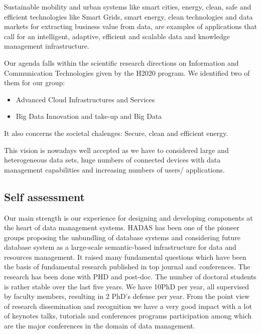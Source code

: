Sustainable mobility and urban systems like smart cities, energy, clean, safe and efficient technologies like Smart Grids, smart energy, clean technologies and  data markets for extracting business value from data, are examples of applications that call for an intelligent, adaptive, efficient and scalable data and knowledge management infrastructure. 

Our agenda falls within the  scientific research directions on Information and Communication Technologies given by  the H2020 program. We identified two of them for our group:
\begin{itemize}
\item Advanced Cloud Infrastructures and Services
\item Big Data Innovation and take-up and Big Data  
\end{itemize}
It also concerns the societal chalenges: Secure, clean and efficient energy. 

This vision is nowadays well accepted as we have to considered large and heterogeneous data sets, huge numbers of connected devices with data management capabilities and increasing numbers of users/ applications. 


\subsection{Self assessment} %
\label{sub:hadas_self_assesment}


Our main strength is our experience for designing and developing components at the heart of data management systems. HADAS has been one of the pioneer groups proposing the unbundling of database systems and considering future database system as a large-scale semantic-based infrastructure for data and resources management. It raised many fundamental questions  which have been the basis of fundamental research published in top journal and conferences. 
The research has been done with PHD and post-doc. The  number of doctoral students is rather stable over the last five years. We have 10PhD per year, all supervised by faculty members, resulting in 2 PhD's defense per year. 
From the point view of research dissemination and recognition we have a very good impact with a lot of keynotes talks, tutorials and conferences
programs participation among which are the major conferences in the domain of data management. 

